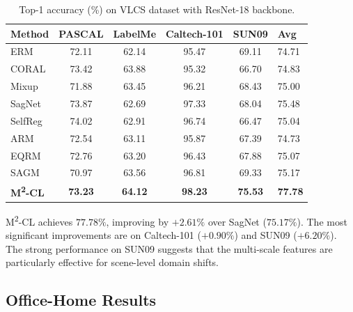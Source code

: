 \documentclass[12pt,a4paper]{article}
\newcommand{\tablehl}{\rowcolor{LightBlue!50}}
\begin{document}
\begin{table}[H]
  \centering
  \caption{Top-1 accuracy (\%) on VLCS dataset with ResNet-18 backbone.}
  \label{tab:vlcs}
  \begin{tabular}{@{}lccccC{1.3cm}@{}}
    \toprule
    \textbf{Method} & \textbf{PASCAL} & \textbf{LabelMe} & \textbf{Caltech-101}
      & \textbf{SUN09} & \textbf{Avg} \\
    \midrule
    ERM       & 72.11 & 62.14 & 95.47 & 69.11 & 74.71 \\
    CORAL     & 73.42 & 63.88 & 95.32 & 66.70 & 74.83 \\
    Mixup     & 71.88 & 63.45 & 96.21 & 68.43 & 75.00 \\
    SagNet    & 73.87 & 62.69 & 97.33 & 68.04 & 75.48 \\
    SelfReg   & 74.02 & 62.91 & 96.74 & 66.47 & 75.04 \\
    ARM       & 72.54 & 63.11 & 95.87 & 67.39 & 74.73 \\
    EQRM      & 72.76 & 63.20 & 96.43 & 67.88 & 75.07 \\
    SAGM      & 70.97 & 63.56 & 96.81 & 69.33 & 75.17 \\
    \midrule
    \tablehl
    \textbf{M\textsuperscript{2}-CL} & \textbf{73.23} & \textbf{64.12} & \textbf{98.23}
      & \textbf{75.53} & \textbf{77.78} \\
    \bottomrule
  \end{tabular}
\end{table}

M\textsuperscript{2}-CL achieves $77.78\%$, improving by $+2.61\%$ over SagNet ($75.17\%$).
The most significant improvements are on Caltech-101 ($+0.90\%$) and SUN09 ($+6.20\%$).
The strong performance on SUN09 suggests that the multi-scale features are particularly
effective for scene-level domain shifts.

\subsection{Office-Home Results}
\end{document}
